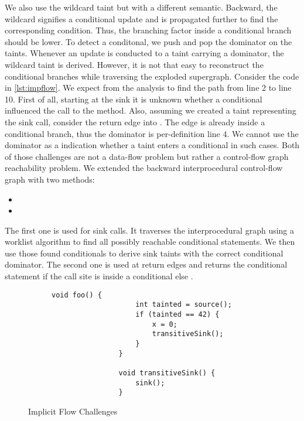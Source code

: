 \documentclass[../draft.tex]{subfiles}
\begin{document}
    We also use the wildcard taint but with a different semantic. 
    Backward, the wildcard signifies a conditional update and is propagated further to find the corresponding condition.
    Thus, the branching factor inside a conditional branch should be lower. 
    To detect a conditonal, we push and pop the dominator on the taints.
    Whenever an update is conducted to a taint carrying a dominator, the wildcard taint is derived.
    However, it is not that easy to reconstruct the conditional branches while traversing the exploded supergraph.
    Consider the code in \autoref{lst:impflow}. 
    We expect from the analysis to find the path from line 2 to line 10. 
    First of all, starting at the sink it is unknown whether a conditional influenced the call to the  method. 
    Also, assuming we created a taint representing the sink call, consider the return edge into . 
    The edge is already inside a conditional branch, thus the dominator is per-definition line 4. 
    We cannot use the dominator as a indication whether a taint enters a conditional in such cases.
    Both of those challenges are not a data-flow problem but rather a control-flow graph reachability problem. 
    We extended the backward interprocedural control-flow graph with two methods:
    \begin{itemize}
        \item {}
        \item {}
    \end{itemize}
    The first one is used for sink calls. 
    It traverses the interprocedural graph using a worklist algorithm to find all possibly reachable conditional statements. 
    We then use those found conditionals to derive sink taints with the correct conditional dominator.
    The second one is used at return edges and returns the conditional statement if the call site is inside a conditional else . 
    
    \begin{figure}[tbp]
        \centering
        \begin{subfigure}[b]{0.45\textwidth}
            \centering
            \begin{lstlisting}[gobble=16]
                void foo() {
                    int tainted = source();
                    if (tainted == 42) {
                        x = 0;
                        transitiveSink();
                    }
                }

                void transitiveSink() {
                    sink();
                }
            \end{lstlisting}
        \end{subfigure}
        \caption{Implicit Flow Challenges}
        \label{lst:impflow}
    \end{figure}
\end{document}
